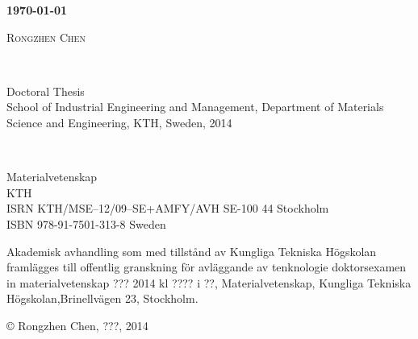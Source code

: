 \documentclass[a4paper, 12pt, titlepage,oneside,drop]{kthesis}
\begin{document}
\setcounter{page}{1}

\begin{center}




  \vspace{5 cm}





  \vspace{12pt}
  \textsc{\LARGE{\textbf{{\today}}}}
  \vspace{12pt}

  \vspace{5 cm}

  \textsc{\large{Rongzhen Chen}}


  \vfill 

  \ 

  \large{Doctoral Thesis}
  \\
  \large{School of Industrial Engineering and Management,
  Department of Materials Science and Engineering,
  KTH, Sweden, 2014}

\end{center}

 \thispagestyle{empty}



\newpage
\setcounter{page}{2}
\thispagestyle{empty}
\
\vfill

\begin{flushright}
 Materialvetenskap\\
 KTH\\
ISRN KTH/MSE--12/09--SE+AMFY/AVH
 \hfill SE-100 44 Stockholm\\ ISBN 978-91-7501-313-8  \hfill
Sweden\\
\end{flushright}


\vspace{5mm}

Akademisk avhandling som med tillstånd av Kungliga Tekniska
Högskolan framlägges till offentlig granskning för avläggande av
tenknologie doktorsexamen in materialvetenskap  ???
2014 kl ???? i ??, Materialvetenskap, Kungliga Tekniska
Högskolan,\linebreak Brinellvägen 23, Stockholm.

\vspace{5mm}

\copyright \hspace{3pt} Rongzhen Chen, ???, 2014

\vspace{5mm}
\end{document}
